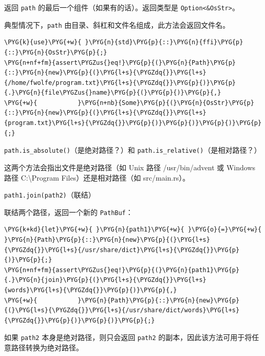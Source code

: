 返回 \texttt{path} 的最后一个组件（如果有的话）。返回类型是 \texttt{Option<\&OsStr>}。

典型情况下，\texttt{path} 由目录、斜杠和文件名组成，此方法会返回文件名。

\begin{Verbatim}[commandchars=\\\{\},breaklines=true,breakanywhere=true,fontsize=\codefont,xleftmargin=17bp]
\PYG{k}{use}\PYG{+w}{ }\PYG{n}{std}\PYG{p}{::}\PYG{n}{ffi}\PYG{p}{::}\PYG{n}{OsStr}\PYG{p}{;}
\PYG{n+nf+fm}{assert\PYGZus{}eq!}\PYG{p}{(}\PYG{n}{Path}\PYG{p}{::}\PYG{n}{new}\PYG{p}{(}\PYG{l+s}{\PYGZdq{}}\PYG{l+s}{/home/fwolfe/program.txt}\PYG{l+s}{\PYGZdq{}}\PYG{p}{)}\PYG{p}{.}\PYG{n}{file\PYGZus{}name}\PYG{p}{(}\PYG{p}{)}\PYG{p}{,}
\PYG{+w}{           }\PYG{n+nb}{Some}\PYG{p}{(}\PYG{n}{OsStr}\PYG{p}{::}\PYG{n}{new}\PYG{p}{(}\PYG{l+s}{\PYGZdq{}}\PYG{l+s}{program.txt}\PYG{l+s}{\PYGZdq{}}\PYG{p}{)}\PYG{p}{)}\PYG{p}{)}\PYG{p}{;}
\end{Verbatim}

\begin{myNote}
\texttt{path.is\_absolute()}（是绝对路径？）和 \texttt{path.is\_relative()}（是相对路径？）
\end{myNote}

这两个方法会指出文件是绝对路径（如 Unix 路径 /usr/bin/advent 或 Windows 路径 C:\textbackslash{}Program Files）还是相对路径（如 src/main.rs）。

\begin{mySidenote}
\texttt{path1.join(path2)}（联结）
\end{mySidenote}

联结两个路径，返回一个新的 \texttt{PathBuf}：

\begin{Verbatim}[commandchars=\\\{\},breaklines=true,breakanywhere=true,fontsize=\codefont,xleftmargin=17bp]
\PYG{k+kd}{let}\PYG{+w}{ }\PYG{n}{path1}\PYG{+w}{ }\PYG{o}{=}\PYG{+w}{ }\PYG{n}{Path}\PYG{p}{::}\PYG{n}{new}\PYG{p}{(}\PYG{l+s}{\PYGZdq{}}\PYG{l+s}{/usr/share/dict}\PYG{l+s}{\PYGZdq{}}\PYG{p}{)}\PYG{p}{;}
\PYG{n+nf+fm}{assert\PYGZus{}eq!}\PYG{p}{(}\PYG{n}{path1}\PYG{p}{.}\PYG{n}{join}\PYG{p}{(}\PYG{l+s}{\PYGZdq{}}\PYG{l+s}{words}\PYG{l+s}{\PYGZdq{}}\PYG{p}{)}\PYG{p}{,}
\PYG{+w}{           }\PYG{n}{Path}\PYG{p}{::}\PYG{n}{new}\PYG{p}{(}\PYG{l+s}{\PYGZdq{}}\PYG{l+s}{/usr/share/dict/words}\PYG{l+s}{\PYGZdq{}}\PYG{p}{)}\PYG{p}{)}\PYG{p}{;}
\end{Verbatim}

如果 \texttt{path2} 本身是绝对路径，则只会返回 \texttt{path2} 的副本，因此该方法可用于将任意路径转换为绝对路径。

